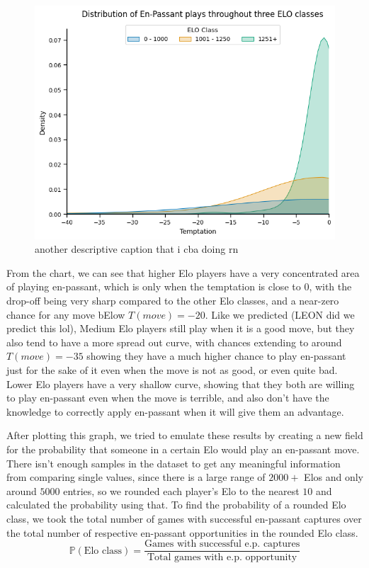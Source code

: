 \documentclass[10pt,a4paper]{article}
\begin{document}
\begin{multicols}{2}
\begin{figure}[t]
  \centering
  \includegraphics[width=\textwidth]{report/images/ep_distplo_alt.png}
  \caption{another descriptive caption that i cba doing rn}
  \label{fds-project-template:fig:ep_distplot}
\end{figure}

From the chart, we can see that higher Elo players have a very concentrated area of playing en-passant, which is only when the temptation is close to $0$, with the drop-off being very sharp compared to the other Elo classes, and a near-zero chance for any move bElow $T(move)=-20$. Like we predicted (LEON did we predict this lol), Medium Elo players still play when it is a good move, but they also tend to have a more spread out curve, with chances extending to around $T(move) = -35$ showing they have a much higher chance to play en-passant just for the sake of it even when the move is not as good, or even quite bad. Lower Elo players have a very shallow curve, showing that they both are willing to play en-passant even when the move is terrible, and also don't have the knowledge to correctly apply en-passant when it will give them an advantage. \newline

After plotting this graph, we tried to emulate these results by creating a new field for the probability that someone in a certain Elo would play an en-passant move. There isn't enough samples in the dataset to get any meaningful information from comparing single values, since there is a large range of $2000+$ Elos and only around $5000$ entries, so we rounded each player's Elo to the nearest $10$ and calculated the probability using that. To find the probability of a rounded Elo class, we took the total number of games with successful en-passant captures over the total number of respective en-passant opportunities in the rounded Elo class.
$$\mathbb{P}(\text{Elo class}) = \frac{\text{Games with successful e.p. captures}}{\text{Total games with e.p. opportunity}}$$


\end{multicols}
\end{document}
